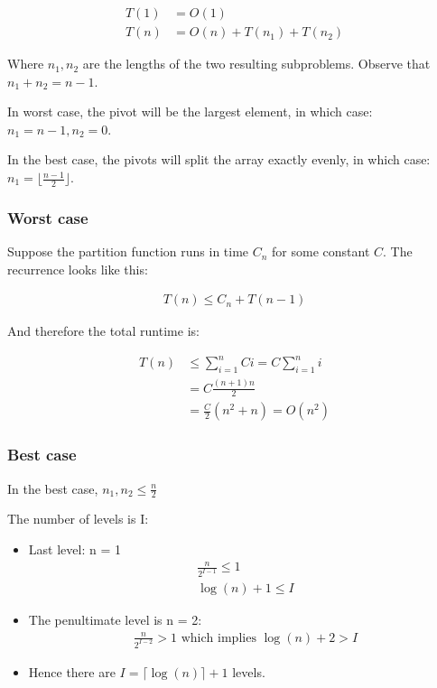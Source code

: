 \documentclass[11pt,a4paper,titlepage,dvipsnames,cmyk]{scrartcl}
\begin{document}
\begin{align*}
    T(1) &= O(1) \\
    T(n) &= O(n) + T(n_1) + T(n_2)
\end{align*}

Where $n_1, n_2$ are the lengths of the two resulting subproblems. Observe
that $n_1 + n_2 = n - 1$.

In worst case, the pivot will be the largest element, in which case: $n_1
= n - 1, n_2 = 0$.

In the best case, the pivots will split the array exactly evenly, in which
case: $n_1 = \lfloor \frac{n-1}{2} \rfloor$.

\subsubsection{Worst case}%
\label{ssub:Worst case}
Suppose the partition function runs in time $C_n$ for some constant $C$.
The recurrence looks like this:

\begin{align*}
    T(n) \le C_n + T(n-1)
\end{align*}

And therefore the total runtime is:

\begin{align*}
    T(n) &\le \sum_{i=1}^{n} Ci = C \sum_{i=1}^{n} i \\
    &= C \frac{(n+1)n}{2} \\
    &= \frac{C}{2}(n^2+n) = O(n^2)
\end{align*}

\subsubsection{Best case}%
\label{ssub:Best case}
In the best case, $n_1, n_2 \le \frac{n}{2}$

The number of levels is I:
\begin{itemize}
    \item Last level: n = 1
        \begin{align*}
            \frac{n}{2^{I-1}} \le 1 \\
            \log(n) + 1 \le I
        \end{align*}
    \item The penultimate level is n = 2:
        \begin{align*}
            \frac{n}{2^{I-2}} > 1 \text { which implies } \log(n) + 2 > I
        \end{align*}
    \item Hence there are $I = \lceil \log(n) \rceil + 1$ levels.
\end{itemize}
\end{document}
